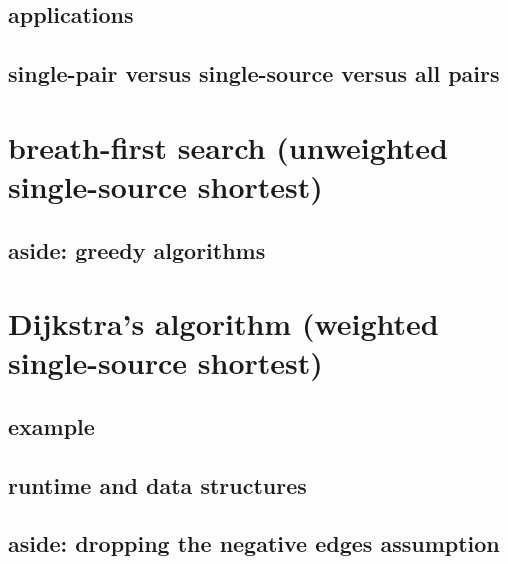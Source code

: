 

\subsection{applications}



\subsection{single-pair versus single-source versus all pairs}



%

\section{breath-first search (unweighted single-source shortest)}



\subsection{aside: greedy algorithms}


\section{Dijkstra's algorithm (weighted single-source shortest)}



\subsection{example}



\subsection{runtime and data structures}



\subsection{aside: dropping the negative edges assumption}



%

